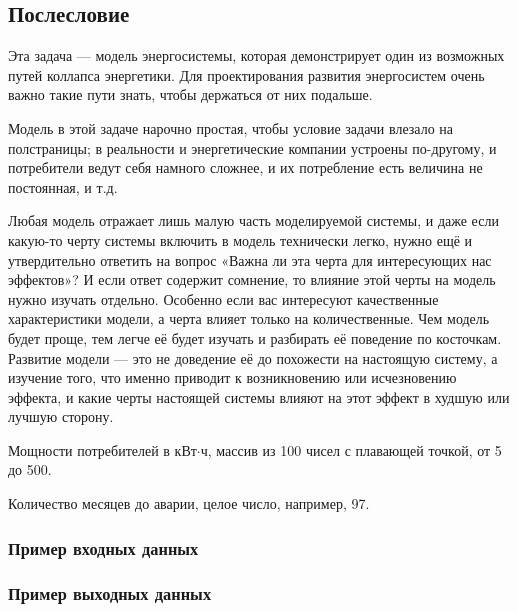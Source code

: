 \subsection*{Послесловие}

Эта задача — модель энергосистемы, которая демонстрирует один из возможных путей коллапса энергетики. Для проектирования развития энергосистем очень важно такие пути знать, чтобы держаться от них подальше.

Модель в этой задаче нарочно простая, чтобы условие задачи влезало на полстраницы; в реальности и энергетические компании устроены по-другому, и потребители ведут себя намного сложнее, и их потребление есть величина не постоянная, и т.д.

Любая модель отражает лишь малую часть моделируемой системы, и даже если какую-то черту системы включить в модель технически легко, нужно ещё и утвердительно ответить на вопрос «Важна ли эта черта для интересующих нас эффектов»? И если ответ содержит сомнение, то влияние этой черты на модель нужно изучать отдельно. Особенно если вас интересуют качественные характеристики модели, а черта влияет только на количественные. Чем модель будет проще, тем легче её будет изучать и разбирать её поведение по косточкам. Развитие модели — это не доведение её до похожести на настоящую систему, а изучение того, что именно приводит к возникновению или исчезновению эффекта, и какие черты настоящей системы влияют на этот эффект в худшую или лучшую сторону.



Мощности потребителей в кВт$\cdot$ч, массив из 100 чисел с плавающей точкой, от 5 до 500.

\outputfmtSection

Количество месяцев до аварии, целое число, например, 97.

\subsubsection*{Пример входных данных}

\noindent[91.05173216589283, 346.59744306410516, 79.340611380049, 6.301441137920902, \\ 
34.63321051774173, 283.7442062865518, 462.85639563921933, 18.35969426088177, \\
114.42284118915013, 348.2511151684352, $\cdots$ ]

\subsubsection*{Пример выходных данных}

